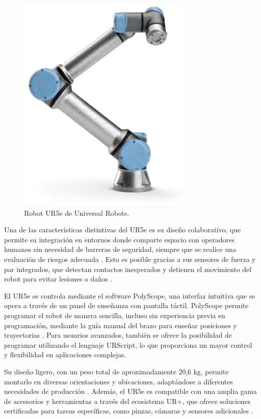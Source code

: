 \begin{figure} [h!]
  \begin{center}
    \includegraphics[width=8.4cm]{figs/UR5e}
  \end{center}
  \caption{\centering Robot UR5e de Universal Robots. \cite{UR5e}}
  \label{fig:UR5e}
\end{figure} 

Una de las características distintivas del UR5e es su diseño colaborativo, que permite su integración en entornos donde comparte espacio con operadores humanos sin necesidad de barreras de seguridad, siempre que se realice una evaluación de riesgos adecuada \cite{UR5e}. Esto es posible gracias a sus sensores de fuerza y par integrados, que detectan contactos inesperados y detienen el movimiento del robot para evitar lesiones o daños \cite{UR5e}.

El UR5e se controla mediante el software PolyScope, una interfaz intuitiva que se opera a través de un panel de enseñanza con pantalla táctil. PolyScope permite programar el robot de manera sencilla, incluso sin experiencia previa en programación, mediante la guía manual del brazo para enseñar posiciones y trayectorias \cite{UR5e}. Para usuarios avanzados, también se ofrece la posibilidad de programar utilizando el lenguaje URScript, lo que proporciona un mayor control y flexibilidad en aplicaciones complejas.

Su diseño ligero, con un peso total de aproximadamente 20,6 kg, permite montarlo en diversas orientaciones y ubicaciones, adaptándose a diferentes necesidades de producción \cite{UR5e}. Además, el UR5e es compatible con una amplia gama de accesorios y herramientas a través del ecosistema UR+, que ofrece soluciones certificadas para tareas específicas, como pinzas, cámaras y sensores adicionales \cite{UR5e}. 

